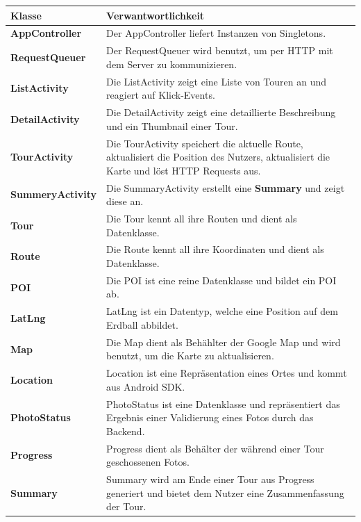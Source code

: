 \documentclass[a4paper,10pt,xetex]{article}
\begin{document}
\begin{longtabu} to \textwidth { | l | X[l] |  }
\hline
\textbf{Klasse} & \textbf{Verwantwortlichkeit}\\\hline
\endhead
\textbf{AppController} & Der AppController liefert Instanzen von Singletons.\\\hline
\textbf{RequestQueuer} & Der RequestQueuer wird benutzt, um per HTTP mit dem
Server zu kommunizieren.\\\hline
\textbf{ListActivity} & Die ListActivity zeigt eine Liste von Touren an und
reagiert auf Klick-Events.\\\hline
\textbf{DetailActivity} & Die DetailActivity zeigt eine detaillierte Beschreibung
und ein Thumbnail einer Tour.\\\hline
\textbf{TourActivity} & Die TourActivity speichert die aktuelle Route, aktualisiert
die Position des Nutzers, aktualisiert die Karte und löst HTTP Requests aus.\\\hline
\textbf{SummeryActivity} & Die SummaryActivity erstellt eine \textbf{Summary}
und zeigt diese an.\\\hline
\textbf{Tour} & Die Tour kennt all ihre Routen und dient als Datenklasse. \\\hline
\textbf{Route} & Die Route kennt all ihre Koordinaten und dient als
Datenklasse. \\\hline
\textbf{POI} & Die POI ist eine reine Datenklasse und bildet ein POI ab.\\\hline
\textbf{LatLng} & LatLng ist ein Datentyp, welche eine Position auf dem
Erdball abbildet.\\\hline
\textbf{Map} & Die Map dient als Behählter der Google Map und wird benutzt, um
die Karte zu aktualisieren.\\\hline
\textbf{Location} & Location ist eine Repräsentation eines Ortes und kommt aus
Android SDK.\\\hline
\textbf{PhotoStatus} & PhotoStatus ist eine Datenklasse und repräsentiert das
Ergebnis einer Validierung eines Fotos durch das Backend.\\\hline
\textbf{Progress} & Progress dient als Behälter der während einer Tour geschossenen
Fotos.\\\hline
\textbf{Summary} & Summary wird am Ende einer Tour aus Progress generiert und
bietet dem Nutzer eine Zusammenfassung der Tour.\\\hline
\end{longtabu}
\end{document}
